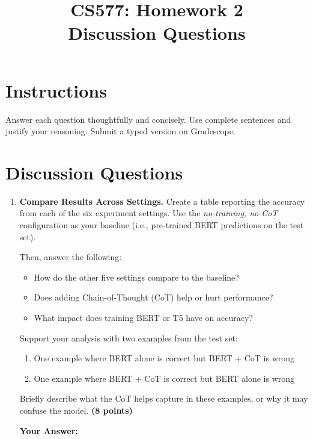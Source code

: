 \documentclass[11pt]{article}
\title{\vspace{-2em}CS577: Homework 2\\Discussion Questions}
\date{}
\begin{document}
\maketitle

\section*{Instructions}
Answer each question thoughtfully and concisely. Use complete sentences and justify your reasoning. Submit a typed version on Gradescope.

\vspace{1em}
\section*{Discussion Questions}

\begin{enumerate}[label=\textbf{\arabic*.}]

\item \textbf{Compare Results Across Settings.}  
Create a table reporting the accuracy from each of the six experiment settings. Use the \textit{no-training, no-CoT} configuration as your baseline (i.e., pre-trained BERT predictions on the test set).  

Then, answer the following:
\begin{itemize}
    \item How do the other five settings compare to the baseline?
    \item Does adding Chain-of-Thought (CoT) help or hurt performance?
    \item What impact does training BERT or T5 have on accuracy?
\end{itemize}

Support your analysis with two examples from the test set:
\begin{enumerate}
    \item One example where BERT alone is correct but BERT + CoT is wrong
    \item One example where BERT + CoT is correct but BERT alone is wrong
\end{enumerate}

Briefly describe what the CoT helps capture in these examples, or why it may confuse the model. \textbf{(8 points)}

\newpage
\textbf{Your Answer:}
\begin{framed}
\vspace{40em}
\end{framed}


\end{enumerate}
\end{document}
